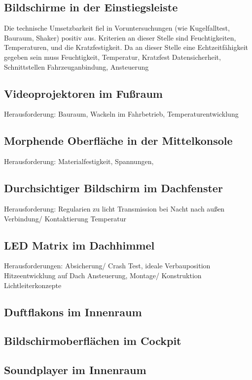 \subsection{Bildschirme in der Einstiegsleiste}

Die technische Umsetzbarkeit fiel in Voruntersuchungen (wie Kugelfalltest, Bauraum, Shaker) positiv aus.
Kriterien an dieser Stelle sind Feuchtigkeiten, Temperaturen, und die Kratzfestigkeit.
Da an dieser Stelle eine Echtzeitfähigkeit gegeben sein muss
Feuchtigkeit, Temperatur, Kratzfest
Datensicherheit, Schnittstellen
Fahrzeuganbindung, Ansteuerung

\subsection{Videoprojektoren im Fußraum}
Herausforderung:
Bauraum, Wackeln im Fahrbetrieb, Temperaturentwicklung
\subsection{Morphende Oberfläche in der Mittelkonsole}
Herausforderung:
Materialfestigkeit, Spannungen,

\subsection{Durchsichtiger Bildschirm im Dachfenster}
Herausforderung:
Regularien zu licht Transmission bei Nacht nach außen
Verbindung/ Kontaktierung
Temperatur
\subsection{LED Matrix im Dachhimmel}
Herausforderungen:
Absicherung/ Crash Test, ideale Verbauposition
Hitzeentwicklung auf Dach
Ansteuerung, Montage/ Konstruktion
Lichtleiterkonzepte
\subsection{Duftflakons im Innenraum}
\subsection{Bildschirmoberflächen im Cockpit}
\subsection{Soundplayer im Innenraum}

